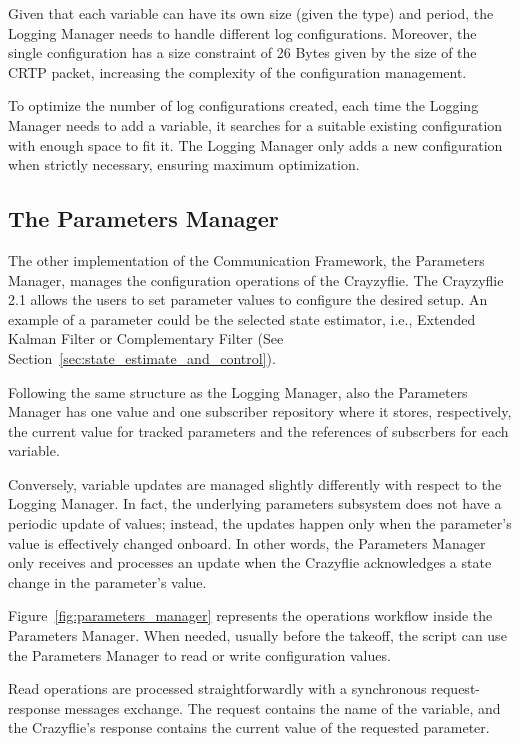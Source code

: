 Given that each variable can have its own size (given the type) and period, the Logging Manager needs to handle different log configurations.
Moreover, the single configuration has a size constraint of 26 Bytes given by the size of the CRTP packet, increasing the complexity of the configuration management.

To optimize the number of log configurations created, each time the Logging Manager needs to add a variable, 
it searches for a suitable existing configuration with enough space to fit it. 
The Logging Manager only adds a new configuration when strictly necessary, ensuring maximum optimization.

\subsection{The Parameters Manager}\label{subsec:parameter_manager}

The other implementation of the Communication Framework, the Parameters Manager, manages the configuration operations of the Crayzyflie.
The Crayzyflie 2.1 allows the users to set parameter values to configure the desired setup. 
An example of a parameter could be the selected state estimator, i.e., Extended Kalman Filter or Complementary Filter (See Section~\ref{sec:state_estimate_and_control}).

Following the same structure as the Logging Manager, also the Parameters Manager has one value and one subscriber repository where it stores, respectively, the current value for tracked parameters and the references of subscrbers for each variable.

Conversely, variable updates are managed slightly differently with respect to the Logging Manager. 
In fact, the underlying parameters subsystem does not have a periodic update of values; instead, the updates happen only when the parameter's value is effectively changed onboard.
In other words, the Parameters Manager only receives and processes an update when the Crazyflie acknowledges a state change in the parameter's value.
 
Figure~\ref{fig:parameters_manager} represents the operations workflow inside the Parameters Manager. When needed, usually before the takeoff,
the script can use the Parameters Manager to read or write configuration values. 

Read operations are processed straightforwardly with a synchronous request-response messages exchange. 
The request contains the name of the variable, and the Crazyflie's response contains the current value of the requested parameter.

